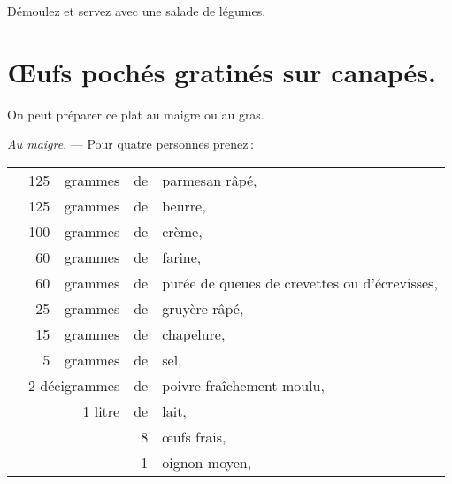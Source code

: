 Démoulez et servez avec une salade de légumes.

\section*{\centering Œufs pochés gratinés sur canapés.}

On peut préparer ce plat au maigre ou au gras.

\medskip

\textit{Au maigre}. — Pour quatre personnes prenez :

\medskip

\footnotesize
\begin{longtable}{rrrrp{16em}}   
  &   125 & grammes & de & parmesan râpé,                                                                 \\
  &   125 & grammes & de & beurre,                                                                        \\
  &   100 & grammes & de & crème,                                                                         \\
  &    60 & grammes & de & farine,                                                                        \\
  &    60 & grammes & de & purée de queues de crevettes ou d'écrevisses,                                  \\
  &    25 & grammes & de & gruyère râpé,                                                                  \\
  &    15 & grammes & de & chapelure,                                                                     \\
  &     5 & grammes & de & sel,                                                                           \\
  & \multicolumn{2}{r}{2 décigrammes} & de & poivre fraîchement moulu,                                    \\
  &       & 1 litre & de & lait,                                                                          \\
  &       &         &  8 & œufs frais,                                                                    \\
  &       &         &  1 & oignon moyen,                                                                  \\

\end{longtable}
